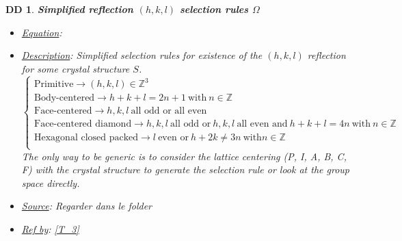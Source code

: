 \documentclass[12pt]{article}
\newtheorem{DD}{DD}
\begin{document}
\begin{DD}
\label{DD_4}
\noindent\colorbox{shadecolorDD}{\normalfont \textbf{Simplified reflection $(h,k,l)$ selection rules $\Omega$ }}
\normalfont
\begin{itemize}
\item \underline{Equation}: 
\item \underline{Description}: Simplified selection rules for existence of the $(h,k,l)$ reflection for some crystal structure $S$. 
 \begin{equation}
 \begin{cases}
\text{Primitive} \rightarrow (h,k,l) \in \mathbb{Z}^{3} \\
\text{Body-centered} \rightarrow h+k+l=2n+1 \ \text{with} \ n \in \mathbb{Z} \\
\text{Face-centered} \rightarrow h,k,l \  \text{all odd or all even} \\
\text{Face-centered diamond} \rightarrow h,k,l \ \text{all odd or} \  h,k,l \ \text{all even and} \ h+k+l=4n \ \text{with} \ n \in \mathbb{Z} \\
\text{Hexagonal closed packed} \rightarrow l  \ \text{even  or} \  h+2k\neq 3n \ \text{with} n \in \mathbb{Z}\\
\end{cases}
\label{eq:refelection_existence}
 \end{equation}
The only way to be generic is to consider the lattice centering (P, I, A, B, C, F) with the crystal structure to generate the selection rule or look at the group space directly.
\item \underline{Source}: Regarder dans le folder
\item \underline{Ref by}: \cref{T_3}
\end{itemize}
\end{DD}
\end{document}
